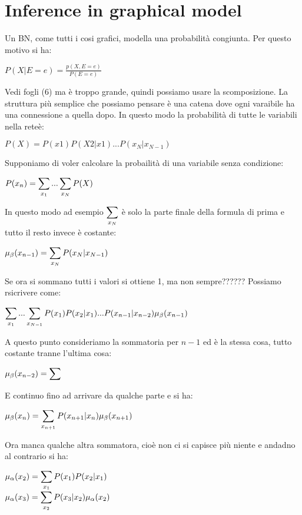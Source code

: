 \section{Inference in graphical model}
Un BN, come tutti i cosi grafici, modella una probabilità congiunta. Per questo motivo si ha:
\begin{center}
	$\displaystyle P(X\vert E=e)=\frac{p(X,E=e)}{P(E=e)}$
\end{center}
Vedi fogli \ins(6) ma è troppo grande, quindi possiamo usare la scomposizione. La struttura più semplice che possiamo pensare è una catena dove ogni varaibile ha una connessione a quella dopo. In questo modo la probabilità di tutte le variabili nella reteè:
\begin{center}
	$\displaystyle P(X)=P(x1)P(X2\vert x1)...P(x_{N}\vert x_{N-1})$
\end{center}
Supponiamo di voler calcolare la probailità di una variabile senza condizione:
\begin{center}
	$\displaystyle P(x_n)=\sum_{x_1}...\displaystyle\sum_{x_N}P(X)$
\end{center}
In questo modo ad esempio $\displaystyle\sum_{x_N}$ è solo la parte finale della formula di prima e tutto il resto invece è costante:
\begin{center}
	$\displaystyle \mu_\beta(x_{n-1})=\displaystyle\sum_{x_N}P(x_N\vert x_{N-1})$
\end{center}
Se ora si sommano tutti i valori si ottiene 1, ma non sempre??????\newline
Possiamo rsicrivere come: 
\begin{center}
	$\displaystyle \sum_{x_1}...\displaystyle\sum_{x_{N-1}}P(x_1)P(x_2\vert x_1)...P(x_{n-1}\vert x_{n-2})\mu_\beta(x_{n-1})$
\end{center}
A questo punto consideriamo la sommatoria per $n-1$ ed è la stessa cosa, tutto costante tranne l'ultima cosa:
\begin{center}
	$\displaystyle \mu_\beta(x_{n-2})=\displaystyle\sum$
\end{center}
E continuo fino ad arrivare da qualche parte e si ha:
\begin{center}
	$\displaystyle \mu_\beta(x_n)=\displaystyle\sum_{x_{n+1}}P(x_{n+1}\vert x_n)\mu_\beta(x_{n+1})$
\end{center}
Ora manca qualche altra sommatora, cioè non ci si capisce più niente e andadno al contrario si ha:
\begin{center}
	$\displaystyle \mu_\alpha(x_2)=\displaystyle\sum_{x_1}P(x_1)P(x_2\vert x_1)$\\
	$\displaystyle \mu_\alpha(x_3)=\displaystyle\sum_{x_2}P(x_3\vert x_2)\mu_\alpha(x_2)$
\end{center}
